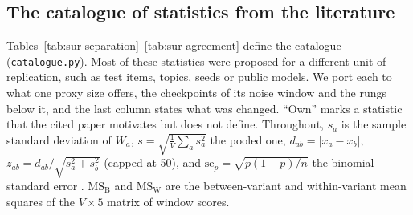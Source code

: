 \subsection{The catalogue of statistics from the literature}
\label{app:sur-catalogue}

Tables~\ref{tab:sur-separation}--\ref{tab:sur-agreement} define the catalogue (\texttt{catalogue.py}).
Most of these statistics were proposed for a different unit of replication, such as test items, topics, seeds or public models.
We port each to what one proxy size offers, the checkpoints of its noise window and the rungs below it, and the last column states what was changed.
``Own'' marks a statistic that the cited paper motivates but does not define.
Throughout, $s_a$ is the sample standard deviation of $W_a$, $s = \sqrt{\frac{1}{V}\sum_a s_a^2}$ the pooled one, $d_{ab} = |x_a - x_b|$, $z_{ab} = d_{ab}/\sqrt{s_a^2 + s_b^2}$ (capped at 50), and $\mathrm{se}_p = \sqrt{p(1-p)/n}$ the binomial standard error \citep{miller_adding_2024}.
$\mathrm{MS_B}$ and $\mathrm{MS_W}$ are the between-variant and within-variant mean squares of the $V \times 5$ matrix of window scores.


